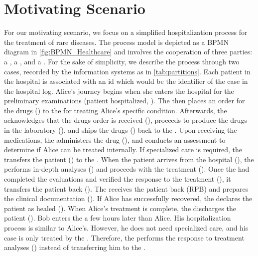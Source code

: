     
\section{Motivating Scenario}\label{sec:motivating}
For our motivating scenario, we focus on a simplified hospitalization process for the treatment of rare diseases.
The process model is depicted as a BPMN diagram in \cref{fig:BPMN_Healthcare} and involves the cooperation of three parties: a , a , and a .
For the sake of simplicity, we describe the process through two cases, recorded by the information systems as in \cref{tab:partitions}. 
Each patient in the hospital is associated with an id which would be the identifier of the case in the hospital log.
Alice's journey %
begins when she enters the hospital for the preliminary examinations (patient hospitalized, ). The  then places an order for the drugs () to the  for  treating Alice's specific condition. Afterwards, the  acknowledges that the drugs order is received (), proceeds to produce the drugs in the laboratory (), and ships the drugs () back to the . Upon receiving the medications, the  administers the drug (), and conducts an assessment to determine if Alice can be treated internally. If specialized care is required, the  transfers the patient () to the . When the patient arrives from the hospital (), the  performs in-depth analyses () and proceeds with the treatment (). Once the  had completed the evaluations and verified the response to the treatment (), it transfers the patient back (). The  receives the patient back \Activ(RPB) and prepares the clinical documentation (). If Alice has successfully recovered, the  declares the patient as healed (). When Alice's treatment is complete, the  discharges the patient (). 
%
Bob %
enters the  a few hours later than Alice. His hospitalization process is similar to Alice's. However, he does not need specialized care, and his case is only treated by the . Therefore, the  performs the response to treatment analyses () instead of transferring him to the . 

